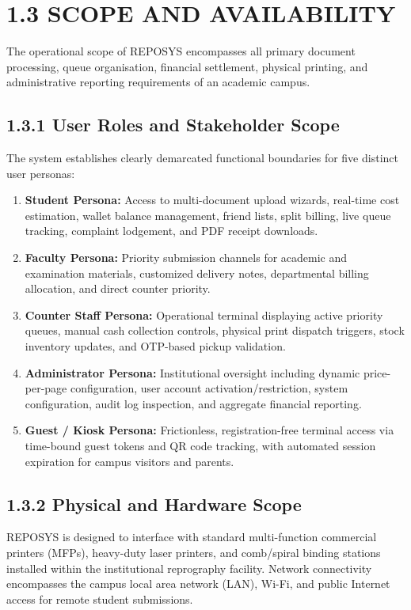 \documentclass[12pt,a4paper,oneside]{report}
\begin{document}
\section{1.3 SCOPE AND AVAILABILITY}
The operational scope of REPOSYS encompasses all primary document processing, queue organisation, financial settlement, physical printing, and administrative reporting requirements of an academic campus.

\subsection{1.3.1 User Roles and Stakeholder Scope}
The system establishes clearly demarcated functional boundaries for five distinct user personas:
\begin{enumerate}[leftmargin=0.35in, itemsep=2pt]
  \item \textbf{Student Persona:} Access to multi-document upload wizards, real-time cost estimation, wallet balance management, friend lists, split billing, live queue tracking, complaint lodgement, and PDF receipt downloads.
  \item \textbf{Faculty Persona:} Priority submission channels for academic and examination materials, customized delivery notes, departmental billing allocation, and direct counter priority.
  \item \textbf{Counter Staff Persona:} Operational terminal displaying active priority queues, manual cash collection controls, physical print dispatch triggers, stock inventory updates, and OTP-based pickup validation.
  \item \textbf{Administrator Persona:} Institutional oversight including dynamic price-per-page configuration, user account activation/restriction, system configuration, audit log inspection, and aggregate financial reporting.
  \item \textbf{Guest / Kiosk Persona:} Frictionless, registration-free terminal access via time-bound guest tokens and QR code tracking, with automated session expiration for campus visitors and parents.
\end{enumerate}

\subsection{1.3.2 Physical and Hardware Scope}
REPOSYS is designed to interface with standard multi-function commercial printers (MFPs), heavy-duty laser printers, and comb/spiral binding stations installed within the institutional reprography facility. Network connectivity encompasses the campus local area network (LAN), Wi-Fi, and public Internet access for remote student submissions.
\end{document}
